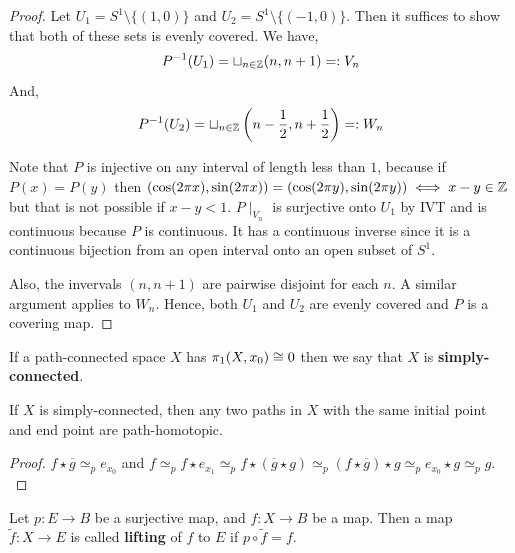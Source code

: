 \documentclass[12pt]{amsart}
\begin{document}
\begin{proof}
    

    Let $U_1 = S^1 \setminus \{(1,0)\}$ and $U_2 = S^1 \setminus \{(-1, 0)\}$. Then it suffices to show that both of these sets is evenly covered. We have,
    \[P^{-1}(U_1) = \sqcup_{n \in \mathbb Z} (n, n+1) =: V_n \]
    And, 
    \[P^{-1}(U_2) = \sqcup_{n \in \mathbb Z} \left( n - \frac{1}{2}, n + \frac{1}{2} \right) =: W_n \]
    

    Note that $P$ is injective on any interval of length less than $1$, because if $P(x) = P(y)$ then $(\cos(2\pi x), \sin(2 \pi x)) = (\cos(2\pi y), \sin(2 \pi y)) \iff x - y \in \mathbb Z$ but that is not possible if $x - y < 1$. $P \mid_{V_n}$ is surjective onto $U_1$ by IVT and is continuous because $P$ is continuous. It has a continuous inverse since it is a continuous bijection from an open interval onto an open subset of $S^1$. 
    
    Also, the invervals $(n, n+1)$ are pairwise disjoint for each $n$. A similar argument applies to $W_n$. Hence, both $U_1$ and $U_2$ are evenly covered and $P$ is a covering map. 
\end{proof}

\begin{definition}
    If a path-connected space $X$ has $\pi_1(X, x_0) \cong 0$ then we say that $X$ is \textbf{simply-connected}.
\end{definition}

\begin{lemma}
    If $X$ is simply-connected, then any two paths in $X$ with the same initial point and end point are path-homotopic. 
\end{lemma}

\begin{proof}
    $f \star \overline{g} \simeq_p e_{x_0}$ and $f \simeq_p f \star e_{x_1} \simeq_p f \star (\overline{g} \star g) \simeq_p (f \star \overline{g}) \star g \simeq_p  e_{x_0} \star g \simeq_p g.$
\end{proof}

\begin{definition}
    Let $p: E \to B$ be a surjective map, and $f: X\to B$ be a map. Then a map $\widetilde{f}: X \to E$ is called \textbf{lifting} of $f$ to $E$ if $p \circ \widetilde{f} = f$. 

    \begin{center}
    \end{center}
\end{definition}
\end{document}
